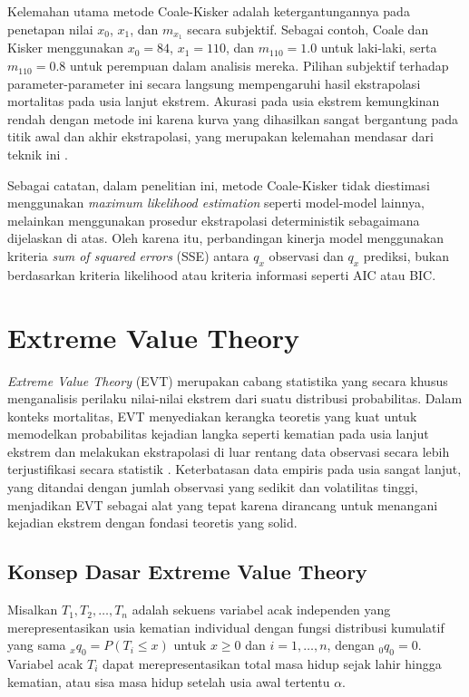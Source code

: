 Kelemahan utama metode Coale-Kisker adalah ketergantungannya pada penetapan nilai $x_0$, $x_1$, dan $m_{x_1}$ secara subjektif. Sebagai contoh, Coale dan Kisker menggunakan $x_0 = 84$, $x_1 = 110$, dan $m_{110} = 1.0$ untuk laki-laki, serta $m_{110} = 0.8$ untuk perempuan dalam analisis mereka. Pilihan subjektif terhadap parameter-parameter ini secara langsung mempengaruhi hasil ekstrapolasi mortalitas pada usia lanjut ekstrem. Akurasi pada usia ekstrem kemungkinan rendah dengan metode ini karena kurva yang dihasilkan sangat bergantung pada titik awal dan akhir ekstrapolasi, yang merupakan kelemahan mendasar dari teknik ini \citep{huang2020modelling}.

Sebagai catatan, dalam penelitian ini, metode Coale-Kisker tidak diestimasi menggunakan \textit{maximum likelihood estimation} seperti model-model lainnya, melainkan menggunakan prosedur ekstrapolasi deterministik sebagaimana dijelaskan di atas. Oleh karena itu, perbandingan kinerja model menggunakan kriteria \textit{sum of squared errors} (SSE) antara $q_x$ observasi dan $q_x$ prediksi, bukan berdasarkan kriteria likelihood atau kriteria informasi seperti AIC atau BIC.

\section{Extreme Value Theory}

\textit{Extreme Value Theory} (EVT) merupakan cabang statistika yang secara khusus menganalisis perilaku nilai-nilai ekstrem dari suatu distribusi probabilitas. Dalam konteks mortalitas, EVT menyediakan kerangka teoretis yang kuat untuk memodelkan probabilitas kejadian langka seperti kematian pada usia lanjut ekstrem dan melakukan ekstrapolasi di luar rentang data observasi secara lebih terjustifikasi secara statistik \citep{coles2001introduction, gbari2017extreme}. Keterbatasan data empiris pada usia sangat lanjut, yang ditandai dengan jumlah observasi yang sedikit dan volatilitas tinggi, menjadikan EVT sebagai alat yang tepat karena dirancang untuk menangani kejadian ekstrem dengan fondasi teoretis yang solid.

\subsection{Konsep Dasar Extreme Value Theory}

Misalkan $T_1, T_2, \ldots, T_n$ adalah sekuens variabel acak independen yang merepresentasikan usia kematian individual dengan fungsi distribusi kumulatif yang sama $_xq_0 = P(T_i \leq x)$ untuk $x \geq 0$ dan $i = 1, \ldots, n$, dengan $_0q_0 = 0$. Variabel acak $T_i$ dapat merepresentasikan total masa hidup sejak lahir hingga kematian, atau sisa masa hidup setelah usia awal tertentu $\alpha$.

